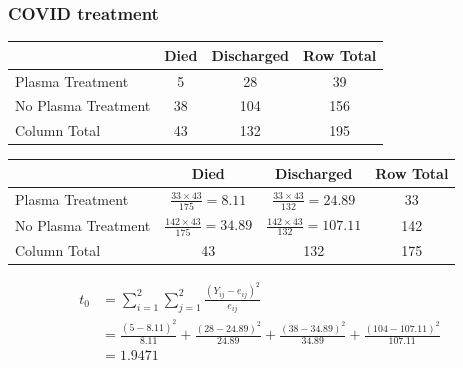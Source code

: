 \documentclass[a4paper]{article}\usepackage[]{graphicx}\usepackage[]{xcolor}
\begin{document}
\subsubsection{COVID treatment}
\begin{table}[H]
	\centering
	\begin{tabular}{@{}lccc@{}}
	\toprule
						& Died & Discharged & Row Total \\ \midrule
	Plasma Treatment    & 5    & 28         & 39  		\\
	No Plasma Treatment & 38   & 104        & 156 		\\ \midrule
	Column Total		& 43   & 132        & 195 		\\ \bottomrule
	\end{tabular}
\end{table}
\begin{table}[H]
	\centering
	\begin{tabular}{@{}lcc|c@{}}
	\toprule
						& Died 									  & Discharged 								& Row Total \\ \midrule
	Plasma Treatment    & \( \frac{33 \times 43}{175} = 8.11 \)   &\( \frac{33 \times 43}{132} = 24.89 \)   & 33  		\\
	No Plasma Treatment & \( \frac{142 \times 43}{175} = 34.89 \) &\( \frac{142 \times 43}{132} = 107.11 \) & 142 		\\ \midrule
	Column Total		& 43   									  & 132        								& 175 		\\ \bottomrule
	\end{tabular}
\end{table}
\begin{align*}
	t_0 &= \sum_{i=1}^{2}\sum_{j=1}^{2} \frac{(Y_{ij} - e_{ij})^2}{e_{ij}}\\
		&= \frac{(5-8.11)^2}{8.11} + \frac{(28-24.89)^2}{24.89} + \frac{(38-34.89)^2}{34.89} + \frac{(104-107.11)^2}{107.11}\\
		&= 1.9471
\end{align*}
\end{document}
